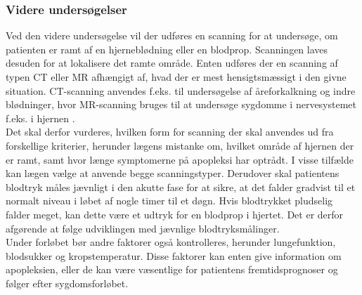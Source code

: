 \subsubsection{Videre undersøgelser}
Ved den videre undersøgelse vil der udføres en scanning for at undersøge, om patienten er ramt af en hjerneblødning eller en blodprop. Scanningen laves desuden for at lokalisere det ramte område. Enten udføres der en scanning af typen CT eller MR afhængigt af, hvad der er mest hensigtsmæssigt i den givne situation. \cite{Sundhedsstyrelsen2009} %
CT-scanning anvendes f.eks. til undersøgelse af åreforkalkning og indre blødninger, hvor MR-scanning bruges til at undersøge sygdomme i nervesystemet f.eks. i hjernen \cite{Hansen2015,Ammundsen2015}.\\
Det skal derfor vurderes, hvilken form for scanning der skal anvendes ud fra forskellige kriterier, herunder lægens mistanke om, hvilket område af hjernen der er ramt, samt hvor længe symptomerne på apopleksi har optrådt. I visse tilfælde kan lægen vælge at anvende begge scanningstyper.  
Derudover skal patientens blodtryk måles jævnligt i den akutte fase for at sikre, at det falder gradvist til et normalt niveau i løbet af nogle timer til et døgn. Hvis blodtrykket pludselig falder meget, kan dette være et udtryk for en blodprop i hjertet. Det er derfor afgørende at følge udviklingen med jævnlige blodtryksmålinger. \cite{Sundhedsstyrelsen2009}
\\
Under forløbet bør andre faktorer også kontrolleres, herunder lungefunktion, blodsukker og kropstemperatur. Disse faktorer kan enten give information om apopleksien, eller de kan være væsentlige for patientens fremtidsprognoser og følger efter sygdomsforløbet. \cite{Sundhedsstyrelsen2009}
\\

